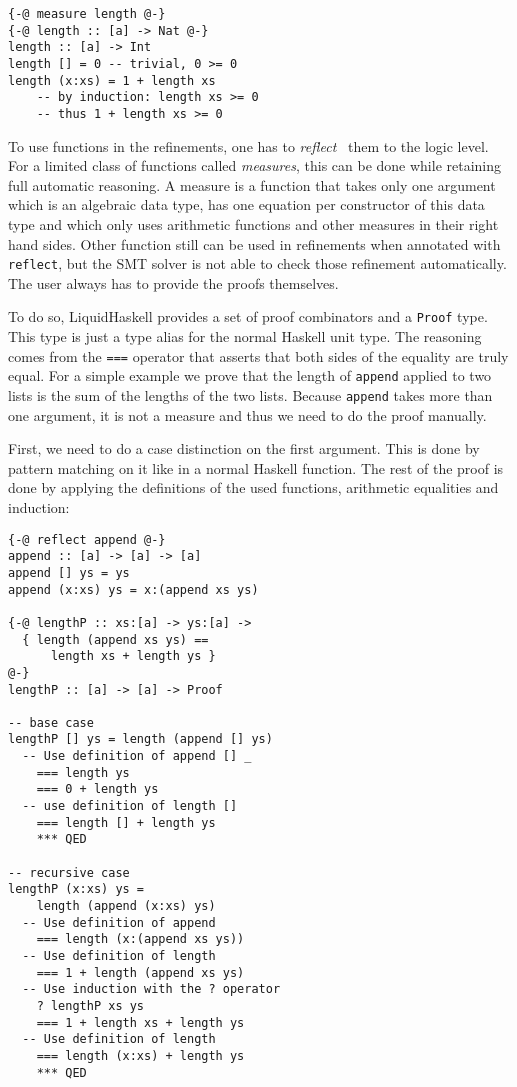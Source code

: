 \documentclass[sigplan,screen,review,anonymous]{acmart}
\begin{document}
\begin{lstlisting}
{-@ measure length @-}
{-@ length :: [a] -> Nat @-}
length :: [a] -> Int
length [] = 0 -- trivial, 0 >= 0
length (x:xs) = 1 + length xs
    -- by induction: length xs >= 0
    -- thus 1 + length xs >= 0
\end{lstlisting}

To use functions in the refinements, one has to \textit{reflect}~\cite{reflection} them to the logic level. For a limited class of functions called \textit{measures}, this can be done while retaining full automatic reasoning. A measure is a function that takes only one argument which is an algebraic data type, has one equation per constructor of this data type and which only uses arithmetic functions and other measures in their right hand sides. Other function still can be used in refinements when annotated with \texttt{reflect}, but the SMT solver is not able to check those refinement automatically. The user always has to provide the proofs themselves.

To do so, LiquidHaskell provides a set of proof combinators and a \texttt{Proof} type. This type is just a type alias for the normal Haskell unit type. The reasoning comes from the \texttt{===} operator that asserts that both sides of the equality are truly equal. For a simple example we prove that the length of \texttt{append} applied to two lists is the sum of the lengths of the two lists. Because \texttt{append} takes more than one argument, it is not a measure and thus we need to do the proof manually.

First, we need to do a case distinction on the first argument. This is done by pattern matching on it like in a normal Haskell function. The rest of the proof is done by applying the definitions of the used functions, arithmetic equalities and induction:

\begin{lstlisting}
{-@ reflect append @-}
append :: [a] -> [a] -> [a]
append [] ys = ys
append (x:xs) ys = x:(append xs ys)

{-@ lengthP :: xs:[a] -> ys:[a] ->
  { length (append xs ys) ==
      length xs + length ys }
@-}
lengthP :: [a] -> [a] -> Proof

-- base case
lengthP [] ys = length (append [] ys)
  -- Use definition of append [] _
    === length ys
    === 0 + length ys
  -- use definition of length []
    === length [] + length ys
    *** QED

-- recursive case
lengthP (x:xs) ys =
    length (append (x:xs) ys)
  -- Use definition of append
    === length (x:(append xs ys))
  -- Use definition of length
    === 1 + length (append xs ys)
  -- Use induction with the ? operator
    ? lengthP xs ys
    === 1 + length xs + length ys
  -- Use definition of length
    === length (x:xs) + length ys
    *** QED
\end{lstlisting}
\end{document}

